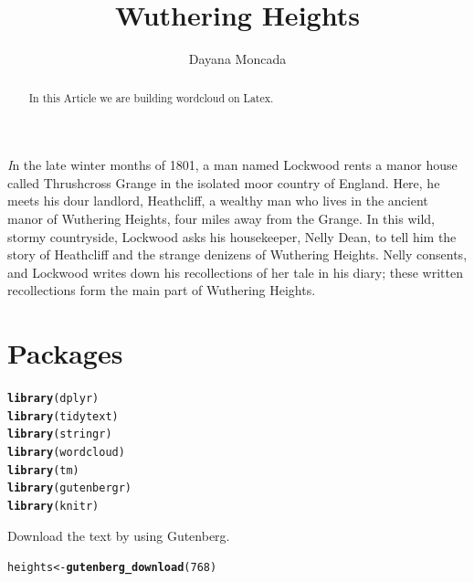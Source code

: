 \documentclass{article}\usepackage[]{graphicx}\usepackage[]{color}
\makeatletter
\newcommand{\hlnum}[1]{\textcolor[rgb]{0.686,0.059,0.569}{#1}}%
\newcommand{\hlstd}[1]{\textcolor[rgb]{0.345,0.345,0.345}{#1}}%
\newcommand{\hlkwb}[1]{\textcolor[rgb]{0.69,0.353,0.396}{#1}}%
\newcommand{\hlkwd}[1]{\textcolor[rgb]{0.737,0.353,0.396}{\textbf{#1}}}%
\newenvironment{kframe}{%
 \def\at@end@of@kframe{}%
 \ifinner\ifhmode%
  \def\at@end@of@kframe{\end{minipage}}%
  \begin{minipage}{\columnwidth}%
 \fi\fi%
 \def\FrameCommand##1{\hskip\@totalleftmargin \hskip-\fboxsep
 \colorbox{shadecolor}{##1}\hskip-\fboxsep
     \hskip-\linewidth \hskip-\@totalleftmargin \hskip\columnwidth}%
 \MakeFramed {\advance\hsize-\width
   \@totalleftmargin\z@ \linewidth\hsize
   \@setminipage}}%
 {\par\unskip\endMakeFramed%
 \at@end@of@kframe}
\newenvironment{knitrout}{}{} %
\makeatother
\begin{document}
\title{Wuthering Heights}
\author{Dayana Moncada}
\maketitle

\begin{abstract}

In this Article we are building wordcloud on Latex.

\end{abstract}

\textit In the late winter months of 1801, a man named Lockwood rents a manor house called Thrushcross Grange in the isolated moor country of England. Here, he meets his dour landlord, Heathcliff, a wealthy man who lives in the ancient manor of Wuthering Heights, four miles away from the Grange. In this wild, stormy countryside, Lockwood asks his housekeeper, Nelly Dean, to tell him the story of Heathcliff and the strange denizens of Wuthering Heights. Nelly consents, and Lockwood writes down his recollections of her tale in his diary; these written recollections form the main part of Wuthering Heights.

\section{Packages}

\begin{knitrout}
\color{fgcolor}\begin{kframe}
\begin{alltt}
\hlkwd{library}\hlstd{(dplyr)}
\hlkwd{library}\hlstd{(tidytext)}
\hlkwd{library}\hlstd{(stringr)}
\hlkwd{library}\hlstd{(wordcloud)}
\hlkwd{library}\hlstd{(tm)}
\hlkwd{library}\hlstd{(gutenbergr)}
\hlkwd{library}\hlstd{(knitr)}
\end{alltt}
\end{kframe}
\end{knitrout}

\noindent Download the text by using Gutenberg.

\begin{knitrout}
\color{fgcolor}\begin{kframe}
\begin{alltt}
\hlstd{heights}\hlkwb{<-}\hlkwd{gutenberg_download}\hlstd{(}\hlnum{768}\hlstd{)}
\end{alltt}
\end{kframe}
\end{knitrout}
\end{document}
